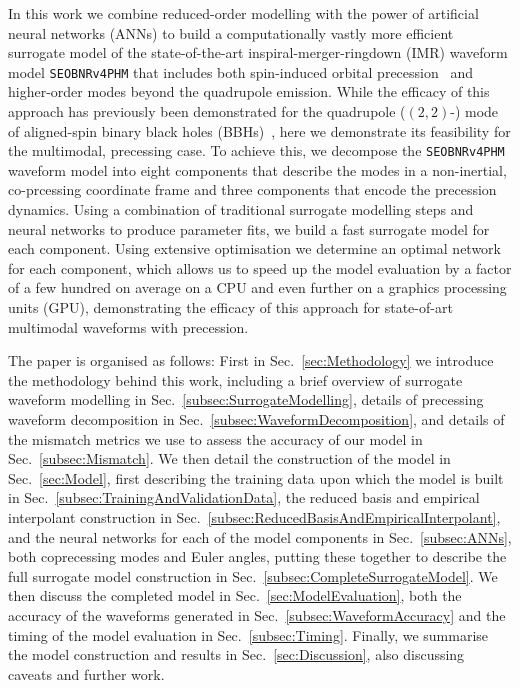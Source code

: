 \documentclass[prd,amssymb,amsmath,amsfonts,superscriptaddress,nofootinbib,reprint,showpacs, longbibliography]{revtex4-1}
\newcommand{\SEOB}{\texttt{SEOBNRv4PHM}}
\begin{document}
In this work we combine reduced-order modelling with the power of artificial neural networks (ANNs) to build a computationally vastly more efficient surrogate model of the state-of-the-art inspiral-merger-ringdown (IMR) waveform model \SEOB{} \cite{Ossokine:2020kjp} that includes both spin-induced orbital precession~\cite{Apostolatos:1994mx} and higher-order modes beyond the quadrupole emission. While the efficacy of this approach has previously been demonstrated for the quadrupole ($(2,2)$-) mode of aligned-spin binary black holes (BBHs)~\cite{Khan:2020fso,Fragkouli:2022lpt}, here we demonstrate its feasibility for the multimodal, precessing case. To achieve this, we decompose the \SEOB{} waveform model into eight components that describe the modes in a non-inertial, co-prcessing coordinate frame and three components that encode the precession dynamics. Using a combination of traditional surrogate modelling steps and neural networks to produce parameter fits, we build a fast surrogate model for each component. Using extensive optimisation we determine an optimal network for each component, which allows us to speed up the model evaluation by a factor of a few hundred on average on a CPU and even further on a graphics processing units (GPU), demonstrating the efficacy of this approach for state-of-art multimodal waveforms with precession.

The paper is organised as follows: First in Sec.~\ref{sec:Methodology} we introduce the methodology behind this work, including a brief overview of surrogate waveform modelling in Sec.~\ref{subsec:SurrogateModelling}, details of precessing waveform decomposition in Sec.~\ref{subsec:WaveformDecomposition}, and details of the mismatch metrics we use to assess the accuracy of our model in Sec.~\ref{subsec:Mismatch}. We then detail the construction of the model in Sec.~\ref{sec:Model}, first describing the training data upon which the model is built in Sec.~\ref{subsec:TrainingAndValidationData}, the reduced basis and empirical interpolant construction in Sec.~\ref{subsec:ReducedBasisAndEmpiricalInterpolant}, and the neural networks for each of the model components in Sec.~\ref{subsec:ANNs}, both coprecessing modes and Euler angles, putting these together to describe the full surrogate model construction in Sec.~\ref{subsec:CompleteSurrogateModel}. We then discuss the completed model in Sec.~\ref{sec:ModelEvaluation}, both the accuracy of the waveforms generated in Sec.~\ref{subsec:WaveformAccuracy} and the timing of the model evaluation in Sec.~\ref{subsec:Timing}. Finally, we summarise the model construction and results in Sec.~\ref{sec:Discussion}, also discussing caveats and further work. 
\end{document}
